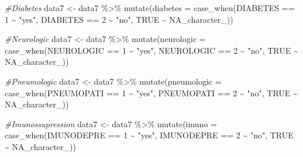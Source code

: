 \documentclass[
]{article}
\newenvironment{Shaded}{\begin{snugshade}}{\end{snugshade}}
\newcommand{\AttributeTok}[1]{\textcolor[rgb]{0.77,0.63,0.00}{#1}}
\newcommand{\CommentTok}[1]{\textcolor[rgb]{0.56,0.35,0.01}{\textit{#1}}}
\newcommand{\ConstantTok}[1]{\textcolor[rgb]{0.00,0.00,0.00}{#1}}
\newcommand{\DecValTok}[1]{\textcolor[rgb]{0.00,0.00,0.81}{#1}}
\newcommand{\FunctionTok}[1]{\textcolor[rgb]{0.00,0.00,0.00}{#1}}
\newcommand{\NormalTok}[1]{#1}
\newcommand{\OtherTok}[1]{\textcolor[rgb]{0.56,0.35,0.01}{#1}}
\newcommand{\SpecialCharTok}[1]{\textcolor[rgb]{0.00,0.00,0.00}{#1}}
\newcommand{\StringTok}[1]{\textcolor[rgb]{0.31,0.60,0.02}{#1}}
\begin{document}
\begin{Shaded}
\begin{Highlighting}[]
\CommentTok{\#Diabetes}
\NormalTok{data7 }\OtherTok{\textless{}{-}}\NormalTok{  data7 }\SpecialCharTok{\%\textgreater{}\%}
  \FunctionTok{mutate}\NormalTok{(}\AttributeTok{diabetes =} \FunctionTok{case\_when}\NormalTok{(DIABETES }\SpecialCharTok{==} \DecValTok{1} \SpecialCharTok{\textasciitilde{}} \StringTok{"yes"}\NormalTok{,}
\NormalTok{                              DIABETES }\SpecialCharTok{==} \DecValTok{2} \SpecialCharTok{\textasciitilde{}} \StringTok{"no"}\NormalTok{,}
                              \ConstantTok{TRUE} \SpecialCharTok{\textasciitilde{}} \ConstantTok{NA\_character\_}\NormalTok{))}

\CommentTok{\#Neurologic}
\NormalTok{data7 }\OtherTok{\textless{}{-}}\NormalTok{  data7 }\SpecialCharTok{\%\textgreater{}\%}
  \FunctionTok{mutate}\NormalTok{(}\AttributeTok{neurologic =} \FunctionTok{case\_when}\NormalTok{(NEUROLOGIC }\SpecialCharTok{==} \DecValTok{1} \SpecialCharTok{\textasciitilde{}} \StringTok{"yes"}\NormalTok{,}
\NormalTok{                                NEUROLOGIC }\SpecialCharTok{==} \DecValTok{2} \SpecialCharTok{\textasciitilde{}} \StringTok{"no"}\NormalTok{,}
                                \ConstantTok{TRUE} \SpecialCharTok{\textasciitilde{}} \ConstantTok{NA\_character\_}\NormalTok{))}

\CommentTok{\#Pneumologic}
\NormalTok{data7 }\OtherTok{\textless{}{-}}\NormalTok{  data7 }\SpecialCharTok{\%\textgreater{}\%}
  \FunctionTok{mutate}\NormalTok{(}\AttributeTok{pneumologic =} \FunctionTok{case\_when}\NormalTok{(PNEUMOPATI }\SpecialCharTok{==} \DecValTok{1} \SpecialCharTok{\textasciitilde{}} \StringTok{"yes"}\NormalTok{,}
\NormalTok{                                 PNEUMOPATI }\SpecialCharTok{==} \DecValTok{2} \SpecialCharTok{\textasciitilde{}} \StringTok{"no"}\NormalTok{,}
                                 \ConstantTok{TRUE} \SpecialCharTok{\textasciitilde{}} \ConstantTok{NA\_character\_}\NormalTok{))}

\CommentTok{\#Imunossupression}
\NormalTok{data7 }\OtherTok{\textless{}{-}}\NormalTok{  data7 }\SpecialCharTok{\%\textgreater{}\%}
  \FunctionTok{mutate}\NormalTok{(}\AttributeTok{imuno =} \FunctionTok{case\_when}\NormalTok{(IMUNODEPRE }\SpecialCharTok{==} \DecValTok{1} \SpecialCharTok{\textasciitilde{}} \StringTok{"yes"}\NormalTok{,}
\NormalTok{                           IMUNODEPRE }\SpecialCharTok{==} \DecValTok{2} \SpecialCharTok{\textasciitilde{}} \StringTok{"no"}\NormalTok{,}
                           \ConstantTok{TRUE} \SpecialCharTok{\textasciitilde{}} \ConstantTok{NA\_character\_}\NormalTok{))}


\end{Highlighting}
\end{Shaded}
\end{document}
